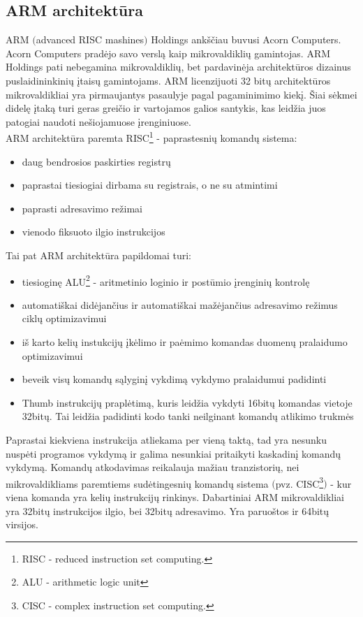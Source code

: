 \documentclass[a4paper, 12pt]{article} %
\begin{document}
\begin{onehalfspacing}
\newpage

\section{ARM architekt\={u}ra}
ARM $($advanced RISC mashines$)$ Holdings ank\v{s}\v{c}iau buvusi Acorn Computers. Acorn Computers prad\.{e}jo savo versl\k{a} kaip mikrovaldikli\k{u} gamintojas. ARM Holdings pati nebegamina mikrovaldikli\k{u}, bet pardavin\.{e}ja architekt\={u}ros dizainus puslaidininkini\k{u} \k{i}tais\k{u} gamintojams. ARM licenzijuoti 32 bit\k{u} architekt\={u}ros mikrovaldikliai yra pirmaujantys pasaulyje pagal pagaminimimo kiek\k{i}. \v{S}iai s\.{e}kmei didel\k{e} \k{i}tak\k{a} turi geras grei\v{c}io ir vartojamos galios santykis, kas leid\v{z}ia juos patogiai naudoti ne\v{s}iojamuose \k{i}renginiuose.    \\
\indent ARM architekt\={u}ra paremta RISC\footnote{RISC - reduced instruction set computing.} - paprastesni\k{u} komand\k{u} sistema:
\begin{itemize} 
\item daug bendrosios paskirties registr\k{u}
\item paprastai tiesiogiai dirbama su registrais, o ne su atmintimi
\item paprasti adresavimo re\v{z}imai
\item vienodo fiksuoto ilgio instrukcijos
\end{itemize} 
Tai pat ARM architekt\={u}ra papildomai turi:
\begin{itemize}
\item tiesiogin\k{e} ALU\footnote{ALU - arithmetic logic unit} - aritmetinio loginio ir post\={u}mio \k{i}rengini\k{u} kontrol\k{e}
\item automati\v{s}kai did\.{e}jan\v{c}ius ir automati\v{s}kai ma\v{z}\.{e}jan\v{c}ius adresavimo re\v{z}imus cikl\k{u} optimizavimui
\item i\v{s} karto keli\k{u} instukcij\k{u} \k{i}k\.elimo ir pa\.{e}mimo komandas duomen\k{u} pralaidumo optimizavimui
\item beveik vis\k{u} komand\k{u} s\k{a}lygin\k{i} vykdim\k{a} vykdymo pralaidumui padidinti
\item Thumb instrukcij\k{u} prapl\.{e}tim\k{a}, kuris leid\v{z}ia vykdyti 16bit\k{u} komandas vietoje 32bit\k{u}. Tai leid\v{z}ia padidinti kodo tank{i} neilginant komand\k{u} atlikimo trukm\.{e}s
\end{itemize}
Paprastai kiekviena instrukcija atliekama per vien\k{a} takt\k{a}, tad yra nesunku nusp\.{e}ti programos vykdym\k{a} ir galima nesunkiai pritaikyti kaskadin\k{i} komand\k{u} vykdym\k{a}. Komand\k{u} atkodavimas reikalauja ma\v{z}iau tranzistori\k{u}, nei mikrovaldikliams paremtiems sud\.{e}tingesni\k{u} komand\k{u} sistema $($pvz. CISC\footnote{CISC - complex instruction set computing.}$)$ - kur viena komanda yra keli\k{u} instrukcij\k{u} rinkinys. Dabartiniai ARM mikrovaldikliai yra 32bit\k{u} instrukcijos ilgio, bei 32bit\k{u} adresavimo. Yra paruo\v{s}tos ir 64bit\k{u} virsijos. \\

\end{onehalfspacing}
\end{document}
